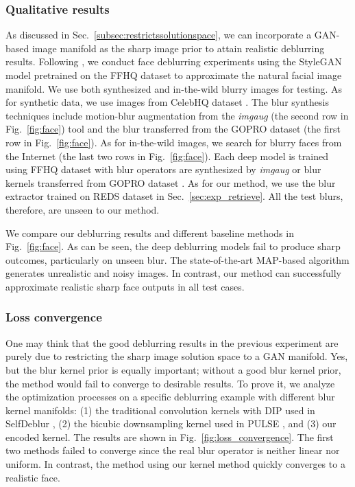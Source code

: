 \documentclass[final]{cvpr}
\newcommand{\Sref}[1]{Sec.~\ref{#1}}
\newcommand{\Fref}[1]{Fig.~\ref{#1}}
\newcommand{\anh}[1]{{\textcolor{cyan}{[Anh: #1]}}}
\begin{document}
\subsubsection{Qualitative results}
As discussed in \Sref{subsec:restrictssolutionspace}, we can incorporate a GAN-based image manifold as the sharp image prior to attain realistic deblurring results. Following \cite{menon2020pulse}, we conduct face deblurring experiments using the StyleGAN model pretrained on the FFHQ dataset to approximate the natural facial image manifold. We use both synthesized and in-the-wild blurry images for testing. As for synthetic data, we use images from CelebHQ dataset \cite{karras2017progressive}. The blur synthesis techniques include motion-blur augmentation from the \textit{imgaug} (the second row in \Fref{fig:face}) tool \cite{imgaug} and the blur transferred from the GOPRO dataset (the first row in \Fref{fig:face}). As for in-the-wild images, we search for blurry faces from the Internet (the last two rows in \Fref{fig:face}). Each deep model is trained using FFHQ dataset \cite{karras2019style} with blur operators are synthesized by \textit{imgaug} or blur kernels transferred from GOPRO dataset \cite{nah2017deep}. As for our method, we use the blur extractor trained on REDS dataset in \Sref{sec:exp_retrieve}. All the test blurs, therefore, are unseen to our method.

We compare our deblurring results and different baseline methods in \Fref{fig:face}. As can be seen, the deep deblurring models \cite{kupyn2019deblurgan,tao2018scale} fail to produce sharp outcomes, particularly on unseen blur. The state-of-the-art MAP-based algorithm \cite{ren2020neural} generates unrealistic and noisy images. In contrast, our method can successfully approximate realistic sharp face outputs in all test cases.

\subsubsection{Loss convergence}
One may think that the good deblurring results in the previous experiment are purely due to restricting the sharp image solution space to a GAN manifold. Yes, but the blur kernel prior is equally important; without a good blur kernel prior, the method would fail to converge to desirable results. To prove it, we analyze the optimization processes on a specific deblurring example with different blur kernel manifolds: (1) the traditional convolution kernels with DIP used in SelfDeblur \cite{ren2020neural}, (2) the bicubic downsampling kernel used in PULSE \cite{menon2020pulse}, and (3) our encoded kernel. The results are shown in \Fref{fig:loss_convergence}. The first two methods failed to converge since the real blur operator is neither linear nor uniform. In contrast, the method using our kernel method quickly converges to a realistic face.
\end{document}
